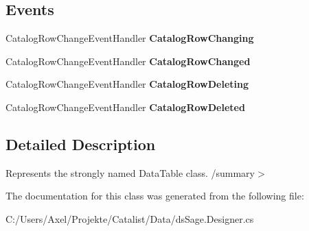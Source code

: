 \subsection*{Events}
\begin{DoxyCompactItemize}
\item 
Catalog\+Row\+Change\+Event\+Handler {\bfseries Catalog\+Row\+Changing}\hypertarget{class_products_1_1_data_1_1ds_sage_1_1_catalog_data_table_a8ea994afa04852646de421ebcd401d4a}{}\label{class_products_1_1_data_1_1ds_sage_1_1_catalog_data_table_a8ea994afa04852646de421ebcd401d4a}

\item 
Catalog\+Row\+Change\+Event\+Handler {\bfseries Catalog\+Row\+Changed}\hypertarget{class_products_1_1_data_1_1ds_sage_1_1_catalog_data_table_a06b0cdcabff6bda280495ffffc470213}{}\label{class_products_1_1_data_1_1ds_sage_1_1_catalog_data_table_a06b0cdcabff6bda280495ffffc470213}

\item 
Catalog\+Row\+Change\+Event\+Handler {\bfseries Catalog\+Row\+Deleting}\hypertarget{class_products_1_1_data_1_1ds_sage_1_1_catalog_data_table_a72b973d552536c4966c0b3c246f1e525}{}\label{class_products_1_1_data_1_1ds_sage_1_1_catalog_data_table_a72b973d552536c4966c0b3c246f1e525}

\item 
Catalog\+Row\+Change\+Event\+Handler {\bfseries Catalog\+Row\+Deleted}\hypertarget{class_products_1_1_data_1_1ds_sage_1_1_catalog_data_table_ad4781ffb5240b45d16b8a4a238981eae}{}\label{class_products_1_1_data_1_1ds_sage_1_1_catalog_data_table_ad4781ffb5240b45d16b8a4a238981eae}

\end{DoxyCompactItemize}


\subsection{Detailed Description}
Represents the strongly named Data\+Table class. /summary$>$ 

The documentation for this class was generated from the following file\+:\begin{DoxyCompactItemize}
\item 
C\+:/\+Users/\+Axel/\+Projekte/\+Catalist/\+Data/ds\+Sage.\+Designer.\+cs\end{DoxyCompactItemize}
